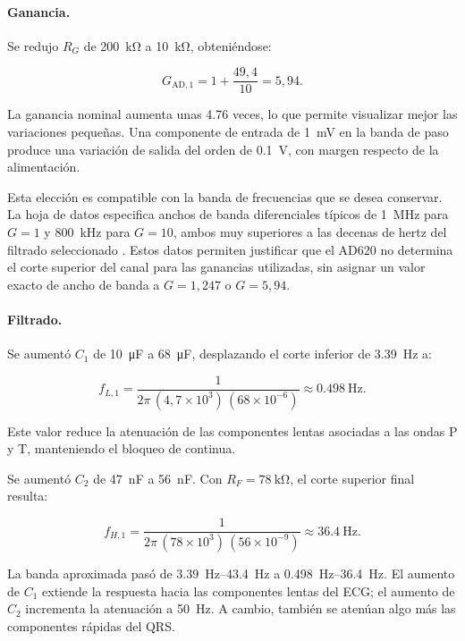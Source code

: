 \documentclass[10pt]{article}
\begin{document}
\paragraph{Ganancia.}

Se redujo $R_G$ de \SI{200}{\kilo\ohm} a \SI{10}{\kilo\ohm}, obteniéndose:

\begin{equation} G_{\mathrm{AD},1}=1+\frac{49{,}4}{10}=5{,}94. \end{equation}

La ganancia nominal aumenta unas \num{4.76} veces, lo que permite visualizar mejor las variaciones pequeñas. Una componente de entrada de \SI{1}{\milli\volt} en la banda de paso produce una variación de salida del orden de \SI{0.1}{\volt}, con margen respecto de la alimentación.

Esta elección es compatible con la banda de frecuencias que se desea conservar. La hoja de datos especifica anchos de banda diferenciales típicos de \SI{1}{\mega\hertz} para $G=1$ y \SI{800}{\kilo\hertz} para $G=10$, ambos muy superiores a las decenas de hertz del filtrado seleccionado \cite{adi_ad620}. Estos datos permiten justificar que el AD620 no determina el corte superior del canal para las ganancias utilizadas, sin asignar un valor exacto de ancho de banda a $G=1{,}247$ o $G=5{,}94$.

\paragraph{Filtrado.}

Se aumentó $C_1$ de \SI{10}{\micro\farad} a \SI{68}{\micro\farad}, desplazando el corte inferior de \SI{3.39}{\hertz} a:

\begin{equation} f_{L,1}=\frac{1}{2\pi\,(4{,}7\times10^3)\,(68\times10^{-6})}\approx\SI{0.498}{\hertz}. \end{equation}

Este valor reduce la atenuación de las componentes lentas asociadas a las ondas P y T, manteniendo el bloqueo de continua.

Se aumentó $C_2$ de \SI{47}{\nano\farad} a \SI{56}{\nano\farad}. Con $R_F=\SI{78}{\kilo\ohm}$, el corte superior final resulta:

\begin{equation} f_{H,1}=\frac{1}{2\pi\,(78\times10^3)\,(56\times10^{-9})}\approx\SI{36.4}{\hertz}. \end{equation}

La banda aproximada pasó de \SI{3.39}{\hertz}--\SI{43.4}{\hertz} a \SI{0.498}{\hertz}--\SI{36.4}{\hertz}. El aumento de $C_1$ extiende la respuesta hacia las componentes lentas del ECG; el aumento de $C_2$ incrementa la atenuación a \SI{50}{\hertz}. A cambio, también se atenúan algo más las componentes rápidas del QRS.
\end{document}
